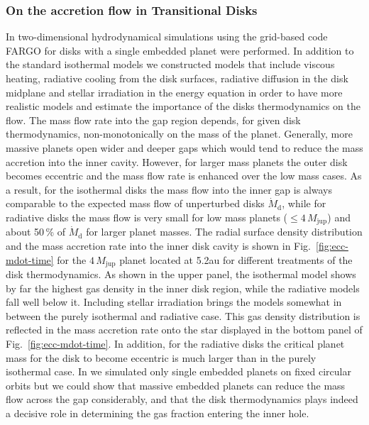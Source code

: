 \documentclass[10pt,fleqn,twoside]{article}
\begin{document}
\subsubsection{On the accretion flow in Transitional Disks}
In \citet{2013A&A...560A..40M} two-dimensional hydrodynamical simulations using the grid-based code 
FARGO for disks with a single embedded planet were performed. 
In addition to the standard isothermal models we constructed models that include 
viscous heating,  radiative cooling from the disk surfaces, 
radiative diffusion in the disk midplane and stellar irradiation in the energy equation in order
to have more realistic models and estimate the importance of the disks thermodynamics on the flow.
The mass flow rate into the gap region depends, for given disk thermodynamics, non-monotonically
on the mass of the planet. Generally, more massive planets open wider and deeper gaps
which would tend to reduce the mass accretion into the inner cavity. However, for larger mass planets
the outer disk becomes eccentric \citep{2006A&A...447..369K} and the mass flow rate is enhanced over the low mass cases.
As a result, for the isothermal disks the mass flow into the inner gap is always comparable to the expected mass flow of
unperturbed disks $\dot{M}_\mathrm{d}$, while for radiative disks the mass flow is very small for
low mass planets ($\leq 4\,M_\mathrm{jup}$) and about 50\,\% of $\dot{M}_\mathrm{d}$ for larger planet masses.
The radial surface density distribution and the mass accretion rate into the inner disk cavity is shown
in Fig.~\ref{fig:ecc-mdot-time} for the $4 \,M_\mathrm{jup}$ planet located at 5.2au for different treatments of the disk
thermodynamics. As shown in the upper panel, the isothermal model shows by far the highest gas density
in the inner disk region, while the radiative models fall well below it. Including stellar irradiation
brings the models somewhat in between the purely isothermal and radiative case.
This gas density distribution is reflected in the mass accretion rate onto the star displayed in the bottom
panel of Fig.~\ref{fig:ecc-mdot-time}. 
In addition, for the radiative disks the critical planet mass for the disk to become eccentric is much larger
than in the purely isothermal case.
In \citet{2013A&A...560A..40M} we simulated only single embedded planets on fixed circular orbits
but we could show that massive embedded planets can reduce the mass flow across the gap considerably,
and that the disk thermodynamics plays indeed a decisive role in determining the gas fraction entering the inner hole.
\end{document}
